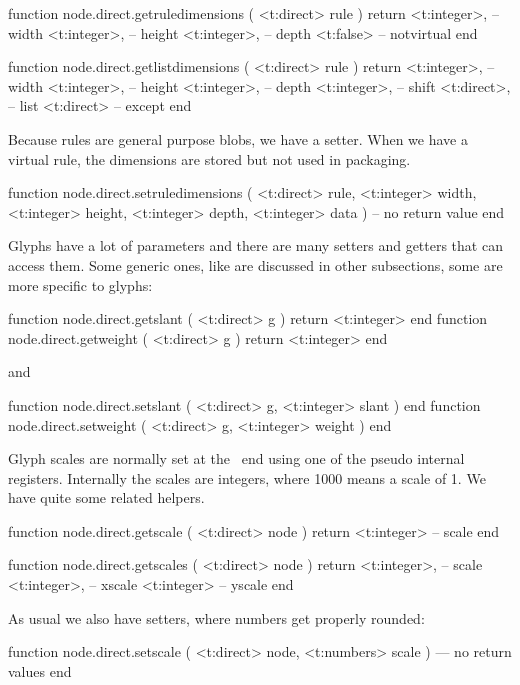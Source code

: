 function node.direct.getruledimensions ( <t:direct> rule )
    return
    <t:integer>, -- width
    <t:integer>, -- height
    <t:integer>, -- depth
    <t:false>    -- notvirtual
end
\stoptyping

\starttyping[option=LUA]
function node.direct.getlistdimensions ( <t:direct> rule )
    return
        <t:integer>, -- width
        <t:integer>, -- height
        <t:integer>, -- depth
        <t:integer>, -- shift
        <t:direct>,  -- list
        <t:direct>   -- except
end
\stoptyping

Because rules are general purpose blobs, we have a setter. When we have a
virtual rule, the dimensions are stored but not used in packaging.

\starttyping[option=LUA]
function node.direct.setruledimensions (
    <t:direct>  rule,
    <t:integer> width,
    <t:integer> height,
    <t:integer> depth,
    <t:integer> data
)
    -- no return value
end
\stoptyping

\stopsubsection

\startsubsection[title={Glyphs}]

Glyphs have a lot of parameters and there are many setters and getters that
can access them. Some generic ones, like  are discussed
in other subsections, some are more specific to glyphs:

\starttyping[option=LUA]
function node.direct.getslant  ( <t:direct> g ) return <t:integer> end
function node.direct.getweight ( <t:direct> g ) return <t:integer> end
\stoptyping

and

\starttyping[option=LUA]
function node.direct.setslant  ( <t:direct> g, <t:integer> slant  ) end
function node.direct.setweight ( <t:direct> g, <t:integer> weight ) end
\stoptyping

Glyph scales are normally set at the \TEX\ end using one of the pseudo internal
registers. Internally the scales are integers, where 1000 means a scale of 1. We
have quite some related helpers.

\starttyping[option=LUA]
function node.direct.getscale (
    <t:direct> node
)
    return <t:integer> -- scale
end

function node.direct.getscales (
    <t:direct> node
)
    return
        <t:integer>, -- scale
        <t:integer>, -- xscale
        <t:integer>  -- yscale
end
\stoptyping

As usual we also have setters, where numbers get properly rounded:

\starttyping[option=LUA]
function node.direct.setscale   (
    <t:direct>  node,
    <t:numbers> scale
)
    --- no return values
end

